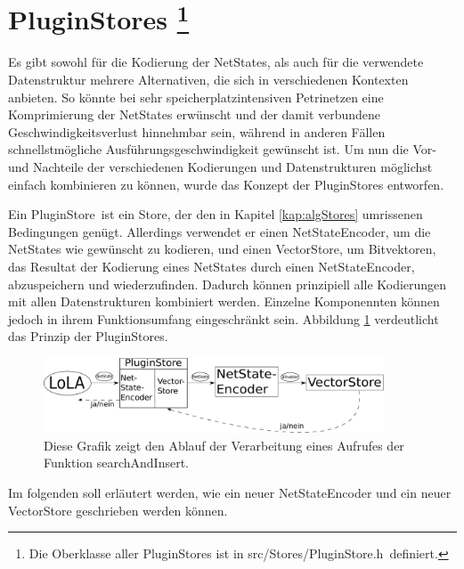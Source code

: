 \documentclass[12pt,a4paper,titlepage]{scrartcl}
\renewcommand \( {\left (}
\renewcommand \) {\right )}
\renewcommand \[ {\left [}
\renewcommand \] {\right ]}
\newcommand \Flqq {\flqq\ }
\begin{document}
\section{PluginStores
\protect\footnote{Die Oberklasse aller PluginStores ist in \frqq src/Stores/PluginStore.h\Flqq definiert.}}
\label{kap:PluginStores}
Es gibt sowohl für die Kodierung der NetStates, als auch für die verwendete Datenstruktur mehrere Alternativen, die sich in verschiedenen Kontexten anbieten. So könnte bei sehr speicherplatzintensiven Petrinetzen eine Komprimierung der NetStates erwünscht und der damit verbundene Geschwindigkeitsverlust hinnehmbar sein, während in anderen Fällen schnellstmögliche Ausführungsgeschwindigkeit gewünscht ist. Um nun die Vor- und Nachteile der verschiedenen Kodierungen und Datenstrukturen möglichst einfach kombinieren zu können, wurde das Konzept der PluginStores entworfen.

Ein \frqq PluginStore\Flqq ist ein Store, der den in Kapitel \ref{kap:algStores} umrissenen Bedingungen genügt. Allerdings verwendet er einen NetStateEncoder, um die NetStates wie gewünscht zu kodieren, und einen VectorStore, um Bitvektoren, das Resultat der Kodierung eines NetStates durch einen NetStateEncoder, abzuspeichern und wiederzufinden. Dadurch können prinzipiell alle Kodierungen mit allen Datenstrukturen kombiniert werden. Einzelne Komponennten können jedoch in ihrem Funktionsumfang eingeschränkt sein. Abbildung \ref{fig:plugin} verdeutlicht das Prinzip der PluginStores.
\begin{figure}[ht]
	\begin{center}
		\includegraphics[width = 0.9\textwidth]{Schema.pdf}
		\caption{Diese Grafik zeigt den Ablauf der Verarbeitung eines Aufrufes der Funktion \frqq searchAndInsert\flqq .}
		\label{fig:plugin}
	\end{center}
\end{figure}

Im folgenden soll erläutert werden, wie ein neuer NetStateEncoder und ein neuer VectorStore geschrieben werden können.
\end{document}
